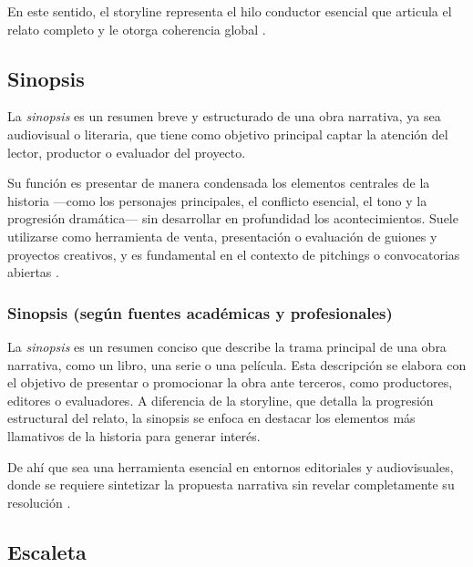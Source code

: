\documentclass[12pt]{article}
\begin{document}
	\hspace{1.27cm}En este sentido, el storyline representa el hilo conductor esencial que articula el relato completo y le otorga coherencia global \parencite{cambridge_storyline}.

	\subsection{Sinopsis}

	\hspace{1.27cm}La \textit{sinopsis} es un resumen breve y estructurado de una obra narrativa, ya sea audiovisual o literaria, que tiene como objetivo principal captar la atención del lector, productor o evaluador del proyecto.

	\hspace{1.27cm}Su función es presentar de manera condensada los elementos centrales de la historia —como los personajes principales, el conflicto esencial, el tono y la progresión dramática— sin desarrollar en profundidad los acontecimientos. Suele utilizarse como herramienta de venta, presentación o evaluación de guiones y proyectos creativos, y es fundamental en el contexto de pitchings o convocatorias abiertas \parencite{studiobinder_sinopsis}.

	\subsubsection{Sinopsis (según fuentes académicas y profesionales)}

	\hspace{1.27cm}La \textit{sinopsis} es un resumen conciso que describe la trama principal de una obra narrativa, como un libro, una serie o una película. Esta descripción se elabora con el objetivo de presentar o promocionar la obra ante terceros, como productores, editores o evaluadores. A diferencia de la storyline, que detalla la progresión estructural del relato, la sinopsis se enfoca en destacar los elementos más llamativos de la historia para generar interés.

	\hspace{1.27cm}De ahí que sea una herramienta esencial en entornos editoriales y audiovisuales, donde se requiere sintetizar la propuesta narrativa sin revelar completamente su resolución \parencite{studiobinder_sinopsis}.

	\subsection{Escaleta}
\end{document}

